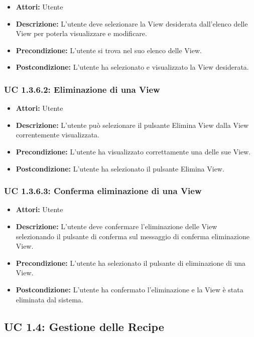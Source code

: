 \begin{itemize}
    \item \textbf{Attori:} Utente
    \item \textbf{Descrizione:} L'utente deve selezionare la View desiderata dall'elenco delle View per poterla visualizzare e modificare.
    \item \textbf{Precondizione:} L'utente si trova nel suo elenco delle View.
    \item \textbf{Postcondizione:} L'utente ha selezionato e visualizzato la View desiderata.
\end{itemize}

\subsubsection{UC 1.3.6.2: Eliminazione di una View}

\begin{itemize}
    \item \textbf{Attori:} Utente
    \item \textbf{Descrizione:} L'utente può selezionare il pulsante Elimina View dalla View correntemente visualizzata.
    \item \textbf{Precondizione:} L'utente ha visualizzato correttamente una delle sue View.
    \item \textbf{Postcondizione:} L'utente ha selezionato il pulsante Elimina View.
\end{itemize}

\subsubsection{UC 1.3.6.3: Conferma eliminazione di una View}

\begin{itemize}
    \item \textbf{Attori:} Utente
    \item \textbf{Descrizione:} L'utente deve confermare l'eliminazione delle View selezionando il pulsante di conferma sul messaggio di conferma eliminazione View.
    \item \textbf{Precondizione:} L'utente ha selezionato il pulsante di eliminazione di una View.
    \item \textbf{Postcondizione:} L'utente ha confermato l'eliminazione e la View è stata eliminata dal sistema.
\end{itemize}




\subsection{UC 1.4: Gestione delle Recipe}

